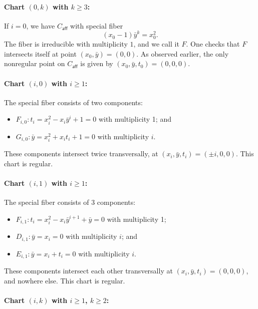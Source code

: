 \documentclass[reqno]{amsart}
\theoremstyle{definition}
\theoremstyle{remark}
\newcommand{\sy}{\bar{y}}
\def\caff{C_{\textsf{aff}}}
\begin{document}
\paragraph{Chart $(0, k)$ with $k \geq 3$:}
\label{sec:case-i=0}

If $i = 0$, we have $\caff$ with special fiber
\[
(x_0 - 1) \sy^k = x_0^2.
\]
The fiber is irreducible with multiplicity $1$, and we call it $F$. One checks that $F$ intersects itself at point $(x_0, \sy) = (0, 0)$. As observed earlier, the only nonregular point on $\caff$ is given by $(x_0, \sy, t_0) = (0, 0, 0)$.

\paragraph{Chart $(i, 0)$ with $i \geq 1$:}
\label{sec:case-k=0}

The special fiber consists of two components:
\begin{itemize}
    \item $F_{i,0}: t_i = x_i^2 - x_i\sy^i + 1 = 0$ with multiplicity 1; and
    \item $G_{i,0}: \sy = x_i^2 + x_it_i + 1 = 0$ with multiplicity $i$.
\end{itemize}
These components intersect twice transversally, at $(x_i, \sy, t_i) = (\pm i, 0, 0)$. This chart is regular.



\paragraph{Chart $(i, 1)$ with $i \geq 1$:}
\label{sec:case-i-1}

The special fiber consists of 3 components:
\begin{itemize}
    \item $F_{i,1}: t_i = x_i^2 - x_i\sy^{i+1} + \sy = 0$ with multiplicity 1;
    \item $D_{i,1}: \sy = x_i = 0$ with multiplicity $i$; and
    \item $E_{i,1}: \sy = x_i + t_i = 0$ with multiplicity $i$.
\end{itemize}
These components intersect each other transversally at $(x_i, \sy, t_i) = (0,0,0)$, and nowhere else. This chart is regular.



\paragraph{Chart $(i, k)$ with $i\geq 1$, $k\geq 2$:}
\label{sec:higher-i-k}
\end{document}
